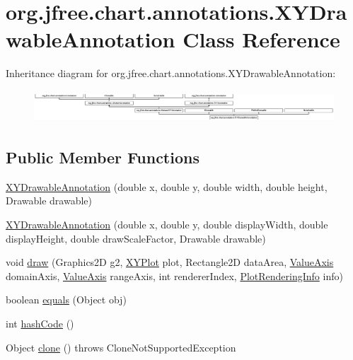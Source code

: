 \hypertarget{classorg_1_1jfree_1_1chart_1_1annotations_1_1_x_y_drawable_annotation}{}\section{org.\+jfree.\+chart.\+annotations.\+X\+Y\+Drawable\+Annotation Class Reference}
\label{classorg_1_1jfree_1_1chart_1_1annotations_1_1_x_y_drawable_annotation}
Inheritance diagram for org.\+jfree.\+chart.\+annotations.\+X\+Y\+Drawable\+Annotation\+:\begin{figure}[H]
\begin{center}
\leavevmode
\includegraphics[height=1.220044cm]{classorg_1_1jfree_1_1chart_1_1annotations_1_1_x_y_drawable_annotation}
\end{center}
\end{figure}
\subsection*{Public Member Functions}
\begin{DoxyCompactItemize}
\item 
\mbox{\hyperlink{classorg_1_1jfree_1_1chart_1_1annotations_1_1_x_y_drawable_annotation_a15862458ab908eaadfb6d658fefe212d}{X\+Y\+Drawable\+Annotation}} (double x, double y, double width, double height, Drawable drawable)
\item 
\mbox{\hyperlink{classorg_1_1jfree_1_1chart_1_1annotations_1_1_x_y_drawable_annotation_a7731312819b6e7b3b3c0fecfc4567f03}{X\+Y\+Drawable\+Annotation}} (double x, double y, double display\+Width, double display\+Height, double draw\+Scale\+Factor, Drawable drawable)
\item 
void \mbox{\hyperlink{classorg_1_1jfree_1_1chart_1_1annotations_1_1_x_y_drawable_annotation_a6ab88727b81e538f5b11e01df1a8e2f9}{draw}} (Graphics2D g2, \mbox{\hyperlink{classorg_1_1jfree_1_1chart_1_1plot_1_1_x_y_plot}{X\+Y\+Plot}} plot, Rectangle2D data\+Area, \mbox{\hyperlink{classorg_1_1jfree_1_1chart_1_1axis_1_1_value_axis}{Value\+Axis}} domain\+Axis, \mbox{\hyperlink{classorg_1_1jfree_1_1chart_1_1axis_1_1_value_axis}{Value\+Axis}} range\+Axis, int renderer\+Index, \mbox{\hyperlink{classorg_1_1jfree_1_1chart_1_1plot_1_1_plot_rendering_info}{Plot\+Rendering\+Info}} info)
\item 
boolean \mbox{\hyperlink{classorg_1_1jfree_1_1chart_1_1annotations_1_1_x_y_drawable_annotation_af28f92e702e92cd4bcdaa77ef2d4db9a}{equals}} (Object obj)
\item 
int \mbox{\hyperlink{classorg_1_1jfree_1_1chart_1_1annotations_1_1_x_y_drawable_annotation_a5dd0f7b338180abf4b29449807e39528}{hash\+Code}} ()
\item 
Object \mbox{\hyperlink{classorg_1_1jfree_1_1chart_1_1annotations_1_1_x_y_drawable_annotation_ae87733ad41a81cca4207236d03111a1e}{clone}} ()  throws Clone\+Not\+Supported\+Exception 
\end{DoxyCompactItemize}
